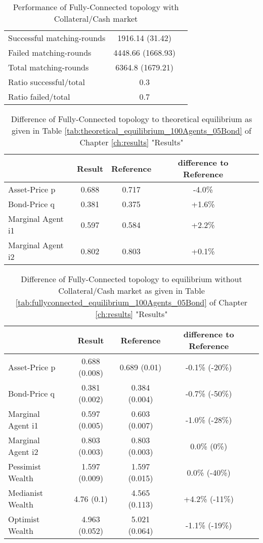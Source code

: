 \documentclass[Bachelorarbeit.tex]{subfiles}
\begin{document}
\begin{table}[H]
	\caption{Performance of Fully-Connected topology with Collateral/Cash market}
	\centering
	\begin{tabular} { l c r }
		\hline
		Successful matching-rounds & 1916.14 (31.42) \\
		Failed matching-rounds & 4448.66 (1668.93) \\
		Total matching-rounds & 6364.8 (1679.21) \\
		\hline
		Ratio successful/total & 0.3 \\
		Ratio failed/total & 0.7 \\
		\hline
	\end{tabular}
\end{table}

\begin{table}[H]
	\caption{Difference of Fully-Connected topology to theoretical equilibrium as given in Table \ref{tab:theoretical_equilibrium_100Agents_05Bond} of Chapter \ref{ch:results} "Results"}
	\centering
	\begin{tabular} { l c c c r }
		& Result & Reference & difference to Reference \\
		\hline
		Asset-Price p & 0.688 & 0.717 & -4.0\% \\
		Bond-Price q & 0.381 & 0.375 & +1.6\% \\
		Marginal Agent i1 & 0.597 & 0.584 & +2.2\% \\
		Marginal Agent i2 & 0.802 & 0.803 & +0.1\% \\
		\hline
	\end{tabular}
\end{table} 

\begin{table}[H]
	\caption{Difference of Fully-Connected topology to equilibrium without Collateral/Cash market as given in Table \ref{tab:fullyconnected_equilibrium_100Agents_05Bond} of Chapter \ref{ch:results} "Results"}
	\centering
	\begin{tabular} { l c c c r }
		& Result & Reference & difference to Reference \\
		\hline
		Asset-Price p & 0.688 (0.008) & 0.689 (0.01) & -0.1\% (-20\%) \\
		Bond-Price q & 0.381 (0.002) & 0.384 (0.004) & -0.7\% (-50\%) \\
		Marginal Agent i1 & 0.597 (0.005) & 0.603 (0.007) & -1.0\% (-28\%) \\
		Marginal Agent i2 & 0.803 (0.003) & 0.803 (0.003) & 0.0\% (0\%) \\
		\hline
		Pessimist Wealth & 1.597 (0.009) & 1.597 (0.015) & 0.0\% (-40\%) \\
		Medianist Wealth & 4.76 (0.1) & 4.565 (0.113) & +4.2\% (-11\%) \\
		Optimist Wealth & 4.963 (0.052) & 5.021 (0.064) & -1.1\% (-19\%) \\
		\hline
	\end{tabular}
\end{table} 
\end{document}
